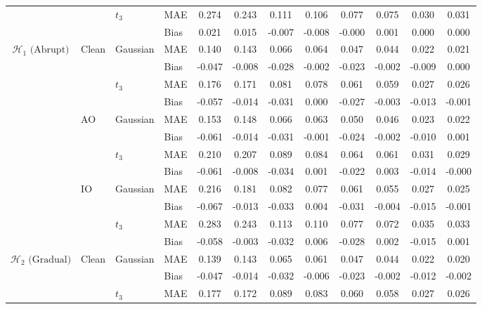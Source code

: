 \documentclass[10pt, a4paper]{article}
\theoremstyle{assumption}
\theoremstyle{definition}
\theoremstyle{theorem}
\begin{document}
\begin{table}[ht]
{\begin{tabular}{clllcc|cc|cc|cc}
\cmidrule{3-12}
& & \multirow{2}{*}{$t_3$} & MAE & 0.274 & 0.243 & 0.111 & 0.106 & 0.077 & 0.075 & 0.030 & 0.031 \\
& & & Bias & 0.021 & 0.015 & -0.007 & -0.008 & -0.000 & 0.001 & 0.000 & 0.000 \\
\midrule
\multirow{12}{*}{$\mathcal{H}_1 \text{ (Abrupt)}$}
& \multirow{4}{*}{Clean} & \multirow{2}{*}{Gaussian} & MAE & 0.140 & 0.143 & 0.066 & 0.064 & 0.047 & 0.044 & 0.022 & 0.021 \\
& & & Bias & -0.047 & -0.008 & -0.028 & -0.002 & -0.023 & -0.002 & -0.009 & 0.000 \\
\cmidrule{3-12}
& & \multirow{2}{*}{$t_3$} & MAE & 0.176 & 0.171 & 0.081 & 0.078 & 0.061 & 0.059 & 0.027 & 0.026 \\
& & & Bias & -0.057 & -0.014 & -0.031 & 0.000 & -0.027 & -0.003 & -0.013 & -0.001 \\
\cmidrule{2-12}
& \multirow{4}{*}{AO} & \multirow{2}{*}{Gaussian} & MAE & 0.153 & 0.148 & 0.066 & 0.063 & 0.050 & 0.046 & 0.023 & 0.022 \\
& & & Bias & -0.061 & -0.014 & -0.031 & -0.001 & -0.024 & -0.002 & -0.010 & 0.001 \\
\cmidrule{3-12}
& & \multirow{2}{*}{$t_3$} & MAE & 0.210 & 0.207 & 0.089 & 0.084 & 0.064 & 0.061 & 0.031 & 0.029 \\
& & & Bias & -0.061 & -0.008 & -0.034 & 0.001 & -0.022 & 0.003 & -0.014 & -0.000 \\
\cmidrule{2-12}
& \multirow{4}{*}{IO} & \multirow{2}{*}{Gaussian} & MAE & 0.216 & 0.181 & 0.082 & 0.077 & 0.061 & 0.055 & 0.027 & 0.025 \\
& & & Bias & -0.067 & -0.013 & -0.033 & 0.004 & -0.031 & -0.004 & -0.015 & -0.001 \\
\cmidrule{3-12}
& & \multirow{2}{*}{$t_3$} & MAE & 0.283 & 0.243 & 0.113 & 0.110 & 0.077 & 0.072 & 0.035 & 0.033 \\
& & & Bias & -0.058 & -0.003 & -0.032 & 0.006 & -0.028 & 0.002 & -0.015 & 0.001 \\
\midrule
\multirow{12}{*}{$\mathcal{H}_2 \text{ (Gradual)}$}
& \multirow{4}{*}{Clean} & \multirow{2}{*}{Gaussian} & MAE & 0.139 & 0.143 & 0.065 & 0.061 & 0.047 & 0.044 & 0.022 & 0.020 \\
& & & Bias & -0.047 & -0.014 & -0.032 & -0.006 & -0.023 & -0.002 & -0.012 & -0.002 \\
\cmidrule{3-12}
& & \multirow{2}{*}{$t_3$} & MAE & 0.177 & 0.172 & 0.089 & 0.083 & 0.060 & 0.058 & 0.027 & 0.026 \\

\end{tabular}}
\end{table}
\end{document}
